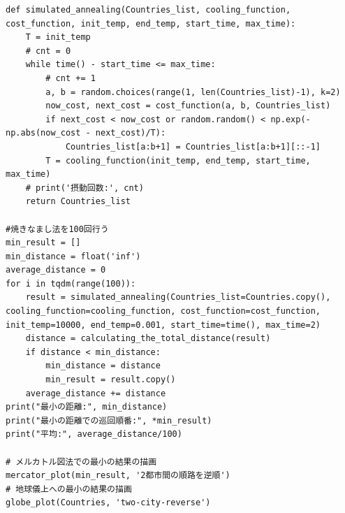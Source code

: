 \documentclass[a4paper,11pt]{ltjsarticle}
\begin{document}
\begin{lstlisting}
def simulated_annealing(Countries_list, cooling_function, cost_function, init_temp, end_temp, start_time, max_time):
    T = init_temp
    # cnt = 0
    while time() - start_time <= max_time:
        # cnt += 1
        a, b = random.choices(range(1, len(Countries_list)-1), k=2)
        now_cost, next_cost = cost_function(a, b, Countries_list)
        if next_cost < now_cost or random.random() < np.exp(-np.abs(now_cost - next_cost)/T):
            Countries_list[a:b+1] = Countries_list[a:b+1][::-1]
        T = cooling_function(init_temp, end_temp, start_time, max_time)
    # print('摂動回数:', cnt)
    return Countries_list

#焼きなまし法を100回行う
min_result = []
min_distance = float('inf')
average_distance = 0
for i in tqdm(range(100)):
    result = simulated_annealing(Countries_list=Countries.copy(), cooling_function=cooling_function, cost_function=cost_function, init_temp=10000, end_temp=0.001, start_time=time(), max_time=2)
    distance = calculating_the_total_distance(result)
    if distance < min_distance:
        min_distance = distance
        min_result = result.copy()
    average_distance += distance
print("最小の距離:", min_distance)
print("最小の距離での巡回順番:", *min_result)
print("平均:", average_distance/100)

# メルカトル図法での最小の結果の描画
mercator_plot(min_result, '2都市間の順路を逆順')
# 地球儀上への最小の結果の描画
globe_plot(Countries, 'two-city-reverse')
\end{lstlisting}
\end{document}
